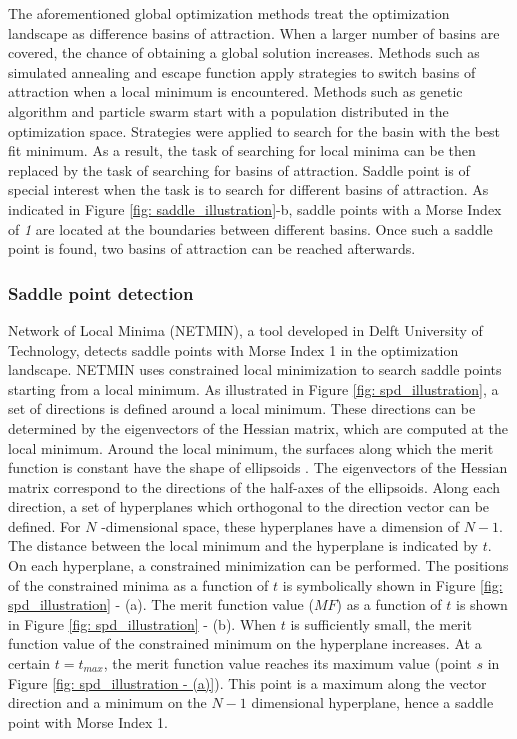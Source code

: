 The aforementioned global optimization methods treat the optimization landscape as difference basins of attraction. When a larger number of basins are covered, the chance of obtaining a global solution increases. Methods such as simulated annealing and escape function apply strategies to switch basins of attraction when a local minimum is encountered. Methods such as genetic algorithm and particle swarm start with a population distributed in the optimization space. Strategies were applied to search for the basin with the best fit minimum. As a result, the task of searching for local minima can be then replaced by the task of searching for basins of attraction. Saddle point is of special interest when the task is to search for different basins of attraction. As indicated in Figure \ref{fig: saddle_illustration}-b, saddle points with a Morse Index of \textit{1} are located at the boundaries between different basins. Once such a saddle point is found, two basins of attraction can be reached afterwards.

\subsubsection{Saddle point detection \label{method: spd}}

Network of Local Minima (NETMIN), a tool developed in Delft University of Technology, detects saddle points with Morse Index 1 in the optimization landscape. NETMIN uses constrained local minimization to search saddle points starting from a local minimum. As illustrated in Figure \ref{fig: spd_illustration}, a set of directions is defined around a local minimum. These directions can be determined by the eigenvectors of the Hessian matrix, which are computed at the local minimum. Around the local minimum, the surfaces along which the merit function is constant have the shape of ellipsoids \cite{MarinescuSPD07}. The eigenvectors of the Hessian matrix correspond to the directions of the half-axes of the ellipsoids. Along each direction, a set of hyperplanes which orthogonal to the direction vector can be defined. For $N$ -dimensional space, these hyperplanes have a dimension of $N-1$. The distance between the local minimum and the hyperplane is indicated by $t$. On each hyperplane, a constrained minimization can be performed. The positions of the constrained minima as a function of  $t$ is symbolically shown in Figure \ref{fig: spd_illustration} - (a). The merit function value ($MF$) as a function of $t$ is shown in Figure \ref{fig: spd_illustration} - (b). When $t$ is sufficiently small, the merit function value of the constrained minimum on the hyperplane increases. At a certain $t = t_{max}$, the merit function value reaches its maximum value (point $s$ in Figure \ref{fig: spd_illustration - (a)}). This point is a maximum along the vector direction and a minimum on the $N-1$ dimensional hyperplane, hence a saddle point with Morse Index 1.  

